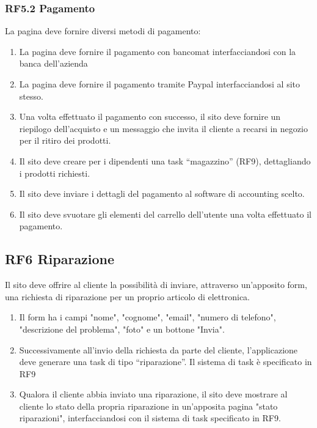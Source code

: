 \documentclass{report}
\begin{document}
\subsubsection*{RF5.2 Pagamento}
La pagina deve fornire diversi metodi di pagamento:

\begin{enumerate}
	\item La pagina deve fornire il pagamento con bancomat interfacciandosi con la banca dell'azienda
	\item La pagina deve fornire il pagamento tramite Paypal interfacciandosi al sito stesso.
	\item Una volta effettuato il pagamento con successo, il sito deve fornire un riepilogo dell’acquisto e un messaggio che invita il cliente a recarsi in negozio per il ritiro dei prodotti.
	\item Il sito deve creare per i dipendenti una task “magazzino” (RF9), dettagliando i prodotti richiesti.
	\item Il sito deve inviare i dettagli del pagamento al software di accounting scelto.
	\item Il sito deve svuotare gli elementi del carrello dell’utente una volta effettuato il pagamento.
\end{enumerate}

\subsection*{RF6 Riparazione}

Il sito deve offrire al cliente la possibilità di inviare, attraverso un'apposito form, una richiesta di riparazione per un proprio articolo di elettronica.
\begin{enumerate}

	
	\item Il form ha i campi "nome", "cognome", "email", "numero di telefono", "descrizione del problema", "foto" e un bottone "Invia".
	
	\item Successivamente all’invio della richiesta da parte del cliente, l’applicazione deve generare una task di tipo “riparazione”. Il sistema di task è specificato in RF9
	
	\item Qualora il cliente abbia inviato una riparazione, il sito deve mostrare al cliente lo stato della propria riparazione in un'apposita pagina "stato riparazioni", interfacciandosi con il sistema di task specificato in RF9.
	
\end{enumerate}
\end{document}
